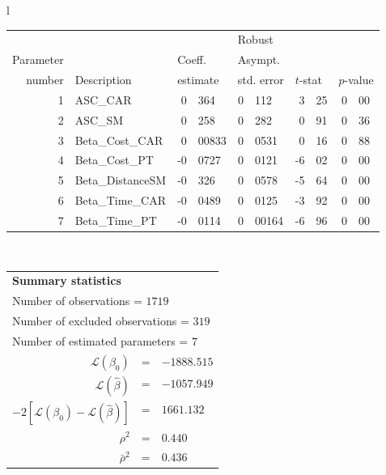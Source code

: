   \begin{tabular}{l}
\begin{tabular}{rlr@{.}lr@{.}lr@{.}lr@{.}l}
         &                       &   \multicolumn{2}{l}{}    & \multicolumn{2}{l}{Robust}  &     \multicolumn{4}{l}{}   \\
Parameter &                       &   \multicolumn{2}{l}{Coeff.}      & \multicolumn{2}{l}{Asympt.}  &     \multicolumn{4}{l}{}   \\
number &  Description                     &   \multicolumn{2}{l}{estimate}      & \multicolumn{2}{l}{std. error}  &   \multicolumn{2}{l}{$t$-stat}  &   \multicolumn{2}{l}{$p$-value}   \\

\hline

1 & ASC_CAR & 0&364 & 0&112 & 3&25 & 0&00\\
2 & ASC_SM & 0&258 & 0&282 & 0&91 & 0&36\\
3 & Beta_Cost_CAR & 0&00833 & 0&0531 & 0&16 & 0&88\\
4 & Beta_Cost_PT & -0&0727 & 0&0121 & -6&02 & 0&00\\
5 & Beta_DistanceSM & -0&326 & 0&0578 & -5&64 & 0&00\\
6 & Beta_Time_CAR & -0&0489 & 0&0125 & -3&92 & 0&00\\
7 & Beta_Time_PT & -0&0114 & 0&00164 & -6&96 & 0&00\\
\hline
\end{tabular}
\\
\begin{tabular}{rcl}
\multicolumn{3}{l}{\bf Summary statistics}\\
\multicolumn{3}{l}{ Number of observations = $1719$} \\
\multicolumn{3}{l}{ Number of excluded observations = $319$} \\
\multicolumn{3}{l}{ Number of estimated  parameters = $7$} \\
 $\mathcal{L}(\beta_0)$ &=&  $-1888.515$ \\
 $\mathcal{L}(\hat{\beta})$ &=& $-1057.949 $  \\
 $-2[\mathcal{L}(\beta_0) -\mathcal{L}(\hat{\beta})]$ &=& $1661.132$ \\
    $\rho^2$ &=&   $0.440$ \\
    $\bar{\rho}^2$ &=&    $0.436$ \\
\end{tabular}
  \end{tabular}
